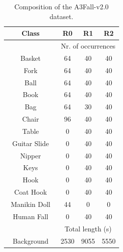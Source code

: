 \begin{table}[t]
	\caption{Composition of the A3Fall-v2.0 dataset.}
	\label{tab:numDataset}
	\begin{center}
		\begin{tabular}[t]{c|ccc}
			
			\hline
			\textbf{Class} & \textbf{R0} & \textbf{R1} & \textbf{R2} \\ %
			\hline
			&\multicolumn{3}{c}{Nr. of occurrences}\\
			Basket      			& 64    &   40 	&   40    	\\
			Fork        			& 64    &   40 	&   40     	\\
			Ball       				& 64    &   40	&   40    	\\
			Book        			& 64    &   40	&   40    	\\
			Bag         			& 64    &   30 	&   40    	\\
			Chair       			& 96    &   40 	&   40    	\\
			Table       			& 0   	&   40 	&   40    	\\
			Guitar Slide       		& 0   	&   40 	&   40    	\\
			Nipper       			& 0    	&   40 	&   40    	\\
			Keys       				& 0    	&   40 	&   40    	\\
			Hook       				& 0    	&   40 	&   40    	\\
			Coat Hook       		& 0    	&   40 	&   40    	\\
			$\,$ Manikin Doll $\,$ 	& 44    &   0 	&   0    	\\
			$\,$ Human Fall $\,$ 	& 0    	&   40 	&   40    	\\
			\hline
			&\multicolumn{3}{c}{Total length (s)}\\			
			Background  			& 2530  &   9055&   5550   	\\
			\hline
		\end{tabular}
	\end{center}
\end{table}

